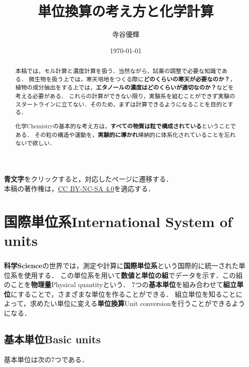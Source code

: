 \documentclass[a4paper,11pt]{ltjsarticle}
\title{\textbf{単位換算の考え方と化学計算}}
\author{寺谷優輝}
\date{\today}
\numberwithin{equation}{section}
\renewcommand{\cite}[1]{\textsuperscript{\citep{#1}}}
\begin{document}
\maketitle

\begin{abstract}
  本稿では，モル計算と濃度計算を扱う．当然ながら，試薬の調整で必要な知識である．
  微生物を扱う上では，寒天培地をつくる際に\textbf{どのくらいの寒天が必要なのか？}，植物の成分抽出をする上では，\textbf{エタノールの濃度はどのくらいが適切なのか？}などを考える必要がある．
  これらの計算ができない限り，実験系を組むことができず実験のスタートラインに立てない．そのため，まずは計算できるようになることを目的とする．

  化学Chemistryの基本的な考え方は，\textbf{すべての物質は粒で構成されている}ということである．
  その粒の構造や運動を，\textbf{実験的に導かれ}帰納的に体系化されていることを忘れないで欲しい．
\end{abstract}

\tableofcontents

\vspace{12pt}

\begin{center}
  \textbf{\color{blue}青文字}をクリックすると，対応したページに遷移する．\\
  本稿の著作権は，\href{https://creativecommons.org/licenses/by-nc-sa/4.0}{CC BY-NC-SA 4.0}を適応する．
\end{center}

\cleardoublepage

\section{国際単位系International System of units}
\label{sec: si}

\textbf{科学Science}の世界では，測定や計算に\textbf{国際単位系}\cite{units-1}という国際的に統一された単位系を使用する．
この単位系を用いて\textbf{数値と単位の組}でデータを示す．この組のことを\textbf{物理量}Physical quantityという．
7つの\textbf{基本単位}を組み合わせて\textbf{組立単位}にすることで，さまざまな単位を作ることができる．
組立単位を知ることによって，求めたい単位に変える\textbf{単位換算}Unit conversionを行うことができるようになる．

\subsection{基本単位Basic units}
\label{sec: basic units}

基本単位は次の7つである．
\end{document}

